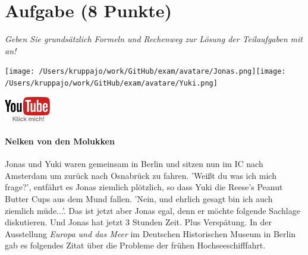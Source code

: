 \documentclass[a4paper, 9pt]{scrartcl}\usepackage[]{graphicx}\usepackage[]{xcolor}
\begin{document}
 
\clearpage

\section{Aufgabe \hfill (8 Punkte)}

\textit{Geben Sie grundsätzlich Formeln und Rechenweg zur Lösung der Teilaufgaben mit an!} \\[1Ex]
 

 
\ifcollection
\begin{flushright}
\tiny\vspace{-3Ex}
\textbf{\examinhaltstart}
\exammodulemathstat
\vspace{-4Ex}
\end{flushright}
\begin{minipage}[t]{0.5\textwidth}
\texttt{[image: /Users/kruppajo/work/GitHub/exam/avatare/Jonas.png]}\hspace{-4mm}\texttt{[image: /Users/kruppajo/work/GitHub/exam/avatare/Yuki.png]}
\end{minipage}
\begin{minipage}[t]{0.5\textwidth}
\hfill
\href{https://youtu.be/1B53cVFIU7Q}{\includegraphics[width = 2cm]{img/youtube}}
\end{minipage}
\fi



\ifcollection
\paragraph{Nelken von den Molukken}
\fi



Jonas und Yuki waren gemeinsam in Berlin und sitzen nun im IC nach Amsterdam um zurück nach Osnabrück zu fahren. 'Weißt du was ich mich frage?', entfährt es Jonas ziemlich plötzlich, so dass Yuki die Reese's Peanut Butter Cups aus dem Mund fallen. 'Nein, und ehrlich gesagt bin ich auch ziemlich müde...'. Das ist jetzt aber Jonas egal, denn er möchte folgende Sachlage diskutieren. Und Jonas hat jetzt 3 Stunden Zeit. Plus Verspätung. In der Ausstellung \textit{Europa und das Meer} im Deutschen Historischen Museum in Berlin gab es folgendes Zitat über die Probleme der frühen Hochseeschifffahrt.
\end{document}

